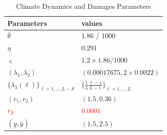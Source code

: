 \documentclass[12pt]{article}
\begin{document}
\begin{appendices}



\begin{table}[!h]
\caption{Climate Dynamics and Damages Parameters} \label{table:climate_parameters}
	\centering
	\begin{tabular}{ll}
   \hline
		Parameters & values\\
		\toprule
		$\bar{\theta}$ & 1.86 / 1000\\
        $\eta$ & 0.291 \\
		$\varsigma$ & $1.2 \times 1.86 / 1000$ \\
		$(\lambda_1, \lambda_2)$ &  $(0.00017675, 2 \times 0.0022)$ \\
  	$\{ \lambda_3(\ell) \}_{\ell = 1, \ldots, L-S}$ & $\{\frac{1}{3} \frac{\ell-1}{L-1}\}_{\ell = 1, \dots, L} $ \\
        $(r_1, r_2)$ & $(1.5, 0.36)$ \\        
        ${\color{red}r_3}$ & ${\color{red}0.0001}$ \\          
		$(\underline{y}, \bar{y})$ & $(1.5, 2.5)$\\
        
		\bottomrule
	\end{tabular}
\end{table}



\end{appendices}
\end{document}
